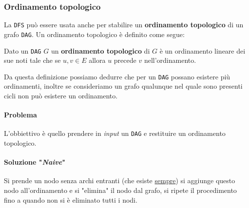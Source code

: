         \subsubsection{Ordinamento topologico}
            La \texttt{DFS} può essere usata anche per stabilire un \textbf{ordinamento topologico} di un grafo \texttt{DAG}. Un ordinamento topologico è definito come segue:
            \begin{definition}
                Dato un \texttt{DAG} $G$ un \textbf{ordinamento topologico} di $G$ è un ordinamento lineare dei sue noti tale che se $u,v\in E$ allora $u$ precede $v$ nell'ordinamento.
            \end{definition}
            Da questa definizione possiamo dedurre che per un \texttt{DAG} possano esistere più ordinamenti, inoltre se consideriamo un grafo qualunque nel quale sono presenti cicli non può esistere un ordinamento.
            \paragraph{Problema} L'obbiettivo è quello prendere in \textit{input} un \texttt{DAG} e restituire un ordinamento topologico.
            \paragraph{Soluzione "\textit{Naive}"} Si prende un nodo senza archi entranti (che esiste \underline{sempre}) si aggiunge questo nodo all'ordinamento e si "elimina" il nodo dal grafo, si ripete il procedimento fino a quando non si è eliminato tutti i nodi. 
